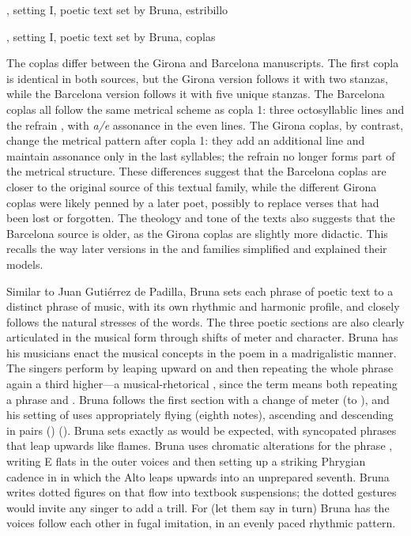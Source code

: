 {, setting I, poetic text set by Bruna,
estribillo}

{, setting I, poetic text set by Bruna, coplas}

The coplas differ between the Girona and Barcelona manuscripts.
The first copla is identical in both sources, but the Girona version follows it
with two stanzas, while the Barcelona version follows it with five unique
stanzas.
The Barcelona coplas all follow the same metrical scheme as copla 1: three
octosyllablic lines and the refrain , with \emph{a/e} assonance
in the even lines.
The Girona coplas, by contrast, change the metrical pattern after copla 1: they
add an additional line and maintain assonance only in the last syllables; the
 refrain no longer forms part of the metrical structure.
These differences suggest that the Barcelona coplas are closer to the original
source of this textual family, while the different Girona coplas were likely
penned by a later poet, possibly to replace verses that had been lost or
forgotten.
The theology and tone of the texts also suggests that the Barcelona source is
older, as the Girona coplas are slightly more didactic.
This recalls the way later versions in the  and  families simplified and explained their
models.

Similar to Juan Gutiérrez de Padilla, Bruna sets each phrase of poetic text to
a distinct phrase of music, with its own rhythmic and harmonic profile,
and closely follows the natural stresses of the words.  
The three poetic sections are also clearly articulated in the musical form
through shifts of meter and character.
Bruna has his musicians enact the musical concepts in the poem in a
madrigalistic manner.  
The singers perform  by leaping upward on
 and then repeating the whole phrase again a third higher---a
musical-rhetorical , since the term means both repeating a
phrase and .
Bruna follows the first section with a change of meter (to \meterC), and his
setting of  uses appropriately
flying  (eighth notes), ascending and descending in pairs
() ().
Bruna sets  exactly as would be expected, with
syncopated phrases that leap upwards like flames.
Bruna uses chromatic alterations for the phrase ,
writing E flats in the outer voices and then setting up a
striking Phrygian cadence in in which the Alto leaps upwards
into an unprepared seventh.  
Bruna writes dotted figures on  that flow into
textbook suspensions; the dotted gestures would invite any singer to add a
trill.
For  (let them say in turn) Bruna has the voices follow
each other in fugal imitation, in an evenly paced rhythmic pattern.

